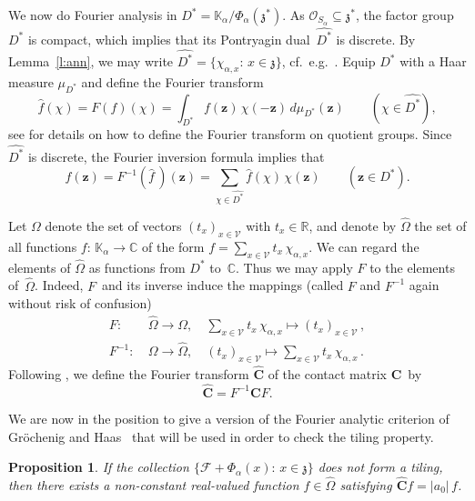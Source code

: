 \documentclass[12pt]{amsart}
\newtheorem{proposition}[lemma]{Proposition}
\theoremstyle{definition}
\theoremstyle{remark}
\numberwithin{equation}{section}
\begin{document}
We now do Fourier analysis in $D^* = \mathbb{K}_\alpha / \Phi_\alpha(\mathfrak{z}^*)$.
As $\mathcal{O}_{S_\alpha} \subseteq \mathfrak{z}^*$, the factor group $D^*$ is compact, which implies that its Pontryagin dual~$\widehat{D^*}$ is discrete.
By Lemma~\ref{l:ann}, we may write $\widehat{D^*} = \{\chi_{\alpha,x}:\, x \in \mathfrak{z}\}$, cf.\ e.g.\ \cite[Theorem~23.25]{Hewitt-Ross:63}.
Equip $D^*$ with a Haar measure $\mu_{D^*}$ and define the Fourier transform
\[
\widehat{f}(\chi) = F(f)(\chi) = \int_{D^*} f(\mathbf{z})\, \chi(-\mathbf{z})\, d\mu_{D^*}(\mathbf{z}) \qquad(\chi \in \widehat{D^*}),
\]
see \cite[Section~31.46]{Hewitt-Ross:70} for details on how to define the Fourier transform on quotient groups.
Since $\widehat{D^*}$ is discrete, the Fourier inversion formula implies that
\[
f(\mathbf{z}) = F^{-1}(\widehat{f}\,)(\mathbf{z}) = \sum_{\chi \in \widehat{D^*}} \widehat f(\chi)\, \chi(\mathbf{z}) \qquad (\mathbf{z} \in D^*).
\]

Let $\Omega$ denote the set of vectors $(t_x)_{x\in \mathcal{V}}$ with $t_x \in \mathbb{R}$, and denote by $\widehat\Omega$ the set of all functions $f:\, \mathbb{K}_\alpha \to \mathbb{C}$ of the form $f = \sum_{x\in\mathcal{V}} t_x\, \chi_{\alpha,x}$.
We can regard the elements of $\widehat\Omega$ as functions from $D^*$ to~$\mathbb{C}$.
Thus we may apply $F$ to the elements of~$\widehat\Omega$.
Indeed, $F$~and its inverse induce the mappings (called $F$ and $F^{-1}$ again without risk of confusion)
\begin{align*}
F: &\ \widehat\Omega \to \Omega, \quad \sum_{x\in\mathcal{V}} t_x\, \chi_{\alpha,x} \mapsto (t_x)_{x\in \mathcal{V}}\,, \\
F^{-1}: &\ \Omega \to \widehat\Omega,  \quad (t_x)_{x\in\mathcal{V}} \mapsto \sum_{x\in\mathcal{V}} t_x\, \chi_{\alpha,x}\,.
\end{align*}
Following \cite[Section~5]{Groechenig-Haas:94}, we define the Fourier transform $\widehat{\mathbf{C}}$ of the contact matrix $\mathbf{C}$~by
\[
\widehat{\mathbf{C}} = F^{-1} \mathbf{C} F.
\]

We are now in the position to give a version of the Fourier analytic criterion of Gr\"ochenig and Haas~\cite[Proposition~5.3]{Groechenig-Haas:94} that will be used in order to check the tiling property.

\begin{proposition} \label{p:53}
If the collection $\{\mathcal{F} + \Phi_\alpha(x):\, x \in \mathfrak{z}\}$ does not form a tiling, then there exists a non-constant real-valued function $f \in \widehat\Omega$ satisfying $\widehat{\mathbf{C}} f = |a_0|\, f$.
\end{proposition}
\end{document}
